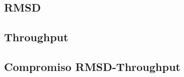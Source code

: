 \subsection{RMSD}\label{sec:resultados:rmsd}


\subsection{Throughput}\label{sec:resultados:throughput}


\subsection{Compromiso RMSD-Throughput}\label{sec:resultados:rms_vs_throughput}

